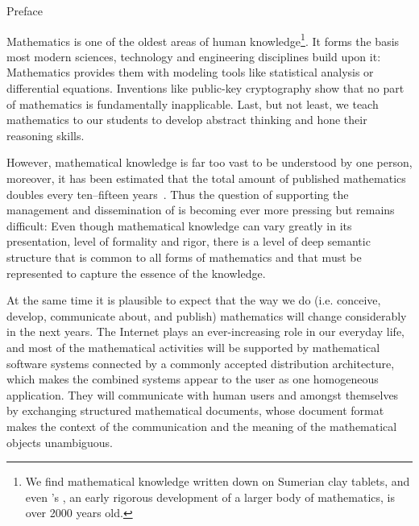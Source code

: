 
\begin{omgroup}[display=flow]{Preface}

Mathematics is one of the oldest areas of human knowledge\footnote{We find mathematical
  knowledge written down on Sumerian clay tablets, and even {}'s
  {\emph{}}, an early rigorous development of a
  larger body of mathematics, is over 2000 years old.}.  It forms the basis most modern
sciences, technology and engineering disciplines build upon it: Mathematics provides them
with modeling tools like statistical analysis or differential equations.  Inventions like
public-key cryptography show that no part of mathematics is fundamentally inapplicable.
Last, but not least, we teach mathematics to our students to develop abstract thinking and
hone their reasoning skills.
  
However, mathematical knowledge is far too vast to be understood by one person, moreover,
it has been estimated that the total amount of published mathematics doubles every
ten--fifteen years~\cite{Odlyzko:tlogr95}. Thus the question of supporting the management
and dissemination of  is becoming ever more pressing but
remains difficult: Even though mathematical knowledge can vary greatly in its
presentation, level of formality and rigor, there is a level of deep semantic structure
that is common to all forms of mathematics and that must be represented to capture the
essence of the knowledge.

At the same time it is plausible to expect that the way we do (i.e. conceive, develop,
communicate about, and publish) mathematics will change considerably in the next years.
The Internet plays an ever-increasing role in our everyday life, and most of the
mathematical activities will be supported by mathematical software systems connected by a
commonly accepted distribution architecture, which makes the combined systems appear to the
user as one homogeneous application. They will communicate with human users and amongst
themselves by exchanging structured mathematical documents, whose document format makes
the context of the communication and the meaning of the mathematical objects unambiguous.


\end{omgroup}
